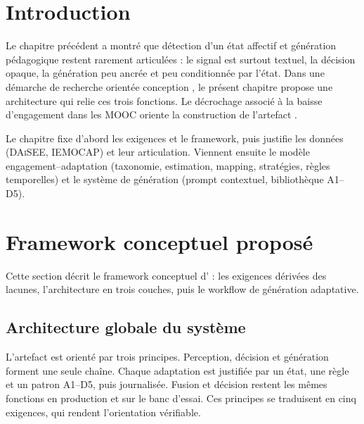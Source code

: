 
\section{Introduction}
\label{sec:ch3-intro}

Le chapitre précédent a montré que détection d'un état affectif et
génération pédagogique restent rarement articulées : le signal est
surtout textuel, la décision opaque, la génération peu ancrée et peu
conditionnée par l'état. Dans une démarche de recherche orientée
conception \cite{hevner2004design}, le présent chapitre propose une
architecture qui relie ces trois fonctions. Le décrochage associé à la
baisse d'engagement dans les MOOC oriente la construction de
l'artefact \emolearn{}.

Le chapitre fixe d'abord les exigences et le framework, puis justifie
les données (\textsc{DAiSEE}, \textsc{IEMOCAP}) et leur articulation.
Viennent ensuite le modèle engagement--adaptation (taxonomie,
estimation, mapping, stratégies, règles temporelles) et le système de
génération (prompt contextuel, bibliothèque A1--D5).

\section{Framework conceptuel proposé}
\label{sec:framework}

Cette section décrit le framework conceptuel d'\emolearn{} : les
exigences dérivées des lacunes,
l'architecture en trois couches, puis le workflow de génération
adaptative.

\subsection{Architecture globale du système}

L'artefact est orienté par trois principes. Perception, décision
et génération forment une seule chaîne. Chaque adaptation est
justifiée par un état, une règle et un patron A1--D5, puis
journalisée. Fusion et décision restent les mêmes fonctions en
production et sur le banc d'essai. Ces principes se traduisent en
cinq exigences, qui rendent l'orientation vérifiable.

